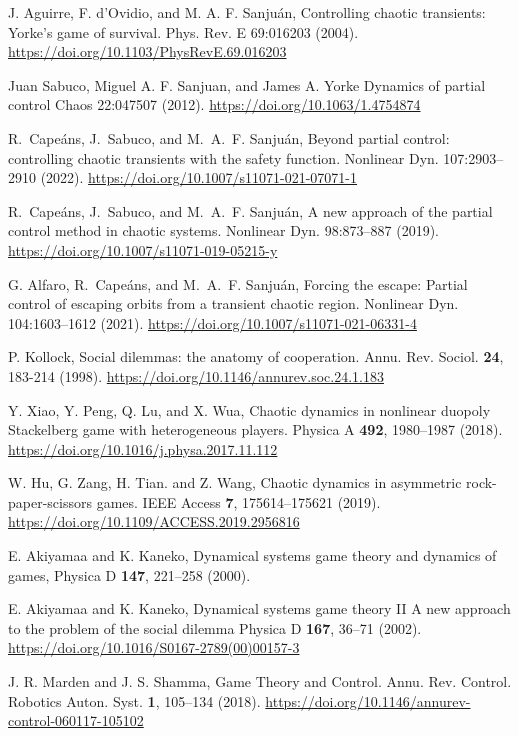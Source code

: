 \begin{thebibliography}{04}



J. Aguirre, F. d’Ovidio, and M. A. F. Sanjuán,
Controlling chaotic transients: Yorke’s game of survival.
Phys. Rev. E 69:016203
(2004).
\url{https://doi.org/10.1103/PhysRevE.69.016203}



Juan Sabuco, Miguel A. F. Sanjuan, and James A. Yorke
Dynamics of partial control
Chaos 22:047507
(2012).
\url{https://doi.org/10.1063/1.4754874}


R.~Cape{\'a}ns, J.~Sabuco, and M.~A.~F. Sanju{\'a}n, 
Beyond partial control: controlling chaotic transients
with the safety function.
Nonlinear Dyn. 107:2903–2910
(2022).
\url{https://doi.org/10.1007/s11071-021-07071-1}

R.~Cape{\'a}ns, J.~Sabuco, and M.~A.~F. Sanju{\'a}n, 
A new approach of the partial control method in chaotic systems.
Nonlinear Dyn. 98:873--887
(2019).
\url{https://doi.org/10.1007/s11071-019-05215-y}

G. Alfaro, R.~Cape{\'a}ns, and M.~A.~F. Sanju{\'a}n, 
Forcing the escape: Partial control of escaping orbits from a
transient chaotic region.
Nonlinear Dyn. 104:1603–1612
(2021). 
\url{https://doi.org/10.1007/s11071-021-06331-4}





P. Kollock,
Social dilemmas: the anatomy of cooperation.
Annu. Rev. Sociol. \textbf{24}, 183-214
(1998).
\url{https://doi.org/10.1146/annurev.soc.24.1.183}

Y. Xiao, Y. Peng, Q. Lu, and X. Wua,
Chaotic dynamics in nonlinear duopoly Stackelberg game
with heterogeneous players.
Physica A \textbf{492}, 1980--1987
(2018).
\url{https://doi.org/10.1016/j.physa.2017.11.112}

W. Hu, G. Zang, H. Tian. and Z. Wang,
Chaotic dynamics in asymmetric rock-paper-scissors games.
IEEE Access \textbf{7}, 175614--175621
(2019).
\url{https://doi.org/10.1109/ACCESS.2019.2956816}

E. Akiyamaa and K. Kaneko,
Dynamical systems game theory and dynamics of games,
Physica D \textbf{147}, 221--258
(2000).
\url{}

E. Akiyamaa and K. Kaneko,
Dynamical systems game theory II
A new approach to the problem of the social dilemma
Physica D \textbf{167}, 36--71
(2002).
\url{https://doi.org/10.1016/S0167-2789(00)00157-3}

J. R. Marden and J. S. Shamma,
Game Theory and Control.
Annu. Rev. Control. Robotics Auton. Syst. \textbf{1}, 105--134
(2018).
\url{https://doi.org/10.1146/annurev-control-060117-105102}



\end{thebibliography}